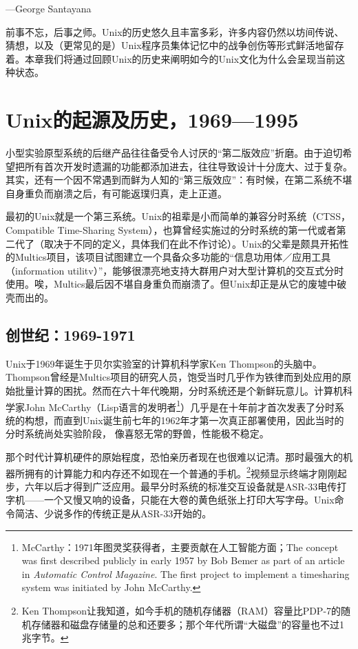 \documentclass[12pt,oneside]{book}
\begin{document}
\begin{common-format}
\begin{flushright}
\begin{notecard}{15em}
{\hfill —George Santayana}
\end{notecard}
\end{flushright}

前事不忘，后事之师。Unix的历史悠久且丰富多彩，许多内容仍然以坊间传说、猜想，以及（更常见的是）Unix程序员集体记忆中的战争创伤等形式鲜活地留存着。本章我们将通过回顾Unix的历史来阐明如今的Unix文化为什么会呈现当前这种状态。

\section{Unix的起源及历史，1969—1995}
小型实验原型系统的后继产品往往备受令人讨厌的“第二版效应”折磨。由于迫切希望把所有首次开发时遗漏的功能都添加进去，往往导致设计十分庞大、过于复杂。其实，还有一个因不常遇到而鲜为人知的“第三版效应”：有时候，在第二系统不堪自身重负而崩溃之后，有可能返璞归真，走上正道。

最初的Unix就是一个第三系统。Unix的祖辈是小而简单的兼容分时系统（CTSS，Compatible Time-Sharing System），也算曾经实施过的分时系统的第一代或者第二代了（取决于不同的定义，具体我们在此不作讨论）。Unix的父辈是颇具开拓性的Multics项目，该项目试图建立一个具备众多功能的“信息功用体／应用工具（information utilitv）”，能够很漂亮地支持大群用户对大型计算机的交互式分时使用。唉，Multics最后因不堪自身重负而崩溃了。但Unix却正是从它的废墟中破壳而出的。

\subsection{创世纪：1969-1971}
Unix于1969年诞生于贝尔实验室的计算机科学家Ken Thompson的头脑中。Thompson曾经是Multics项目的研究人员，饱受当时几乎作为铁律而到处应用的原始批量计算的困扰。然而在六十年代晚期，分时系统还是个新鲜玩意儿。计算机科学家John McCarthy（Lisp语言的发明者\footnote{McCarthy：1971年图灵奖获得者，主要贡献在人工智能方面；The concept was first described publicly in early 1957 by Bob Bemer as part of an article in \textit{Automatic Control Magazine}.  The first project to implement a timesharing system was initiated by John McCarthy. }）几乎是在十年前才首次发表了分时系统的构想，而直到Unix诞生前七年的1962年才第一次真正部署使用，因此当时的分时系统尚处实验阶段，
像喜怒无常的野兽，性能极不稳定。

那个时代计算机硬件的原始程度，恐怕亲历者现在也很难以记清。那时最强大的机器所拥有的计算能力和内存还不如现在一个普通的手机。\footnote{Ken Thompson让我知道，如今手机的随机存储器（RAM）容量比PDP-7的随机存储器和磁盘存储量的总和还要多；那个年代所谓“大磁盘”的容量也不过1兆字节。}视频显示终端才刚刚起步，六年以后才得到广泛应用。最早分时系统的标准交互设备就是ASR-33电传打字机——一个又慢又响的设备，只能在大卷的黄色纸张上打印大写字母。Unix命令简洁、少说多作的传统正是从ASR-33开始的。


\end{common-format}
\end{document}
